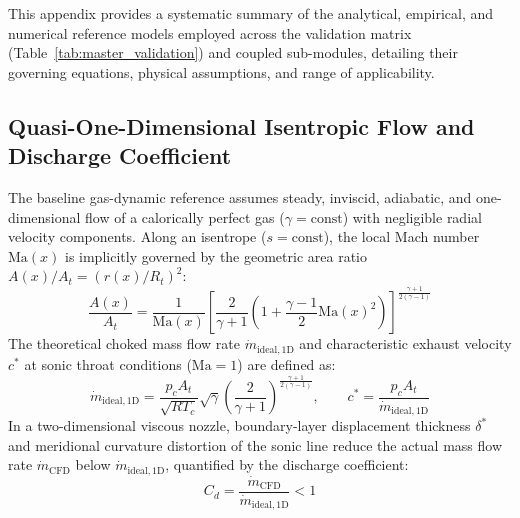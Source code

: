 \documentclass[11pt,a4paper]{article}
\begin{document}
This appendix provides a systematic summary of the analytical, empirical, and numerical reference models employed across the validation matrix (Table~\ref{tab:master_validation}) and coupled sub-modules, detailing their governing equations, physical assumptions, and range of applicability.

\subsection{Quasi-One-Dimensional Isentropic Flow and Discharge Coefficient}
The baseline gas-dynamic reference assumes steady, inviscid, adiabatic, and one-dimensional flow of a calorically perfect gas ($\gamma = \mathrm{const}$) with negligible radial velocity components. Along an isentrope ($s = \mathrm{const}$), the local Mach number $\mathrm{Ma}(x)$ is implicitly governed by the geometric area ratio $A(x)/A_t = (r(x)/R_t)^2$:
\begin{equation}
\frac{A(x)}{A_t} = \frac{1}{\mathrm{Ma}(x)} \left[ \frac{2}{\gamma + 1} \left( 1 + \frac{\gamma - 1}{2} \mathrm{Ma}(x)^2 \right) \right]^{\frac{\gamma + 1}{2(\gamma - 1)}}
\end{equation}
The theoretical choked mass flow rate $\dot{m}_{\mathrm{ideal,1D}}$ and characteristic exhaust velocity $c^*$ at sonic throat conditions ($\mathrm{Ma} = 1$) are defined as:
\begin{equation}
\dot{m}_{\mathrm{ideal,1D}} = \frac{p_c A_t}{\sqrt{R T_c}} \sqrt{\gamma} \left( \frac{2}{\gamma + 1} \right)^{\frac{\gamma + 1}{2(\gamma - 1)}}, \qquad c^* = \frac{p_c A_t}{\dot{m}_{\mathrm{ideal,1D}}}
\end{equation}
In a two-dimensional viscous nozzle, boundary-layer displacement thickness $\delta^*$ and meridional curvature distortion of the sonic line reduce the actual mass flow rate $\dot{m}_{\mathrm{CFD}}$ below $\dot{m}_{\mathrm{ideal,1D}}$, quantified by the discharge coefficient:
\begin{equation}
C_d = \frac{\dot{m}_{\mathrm{CFD}}}{\dot{m}_{\mathrm{ideal,1D}}} < 1
\end{equation}
\end{document}
